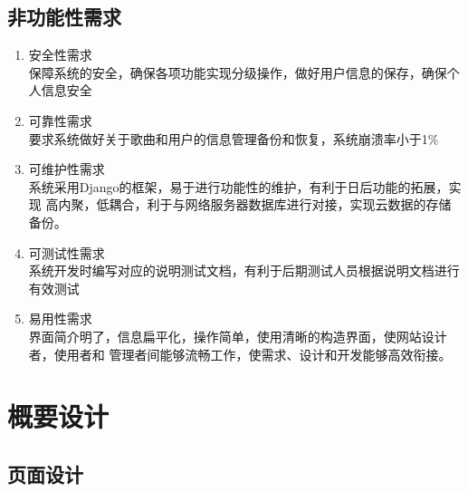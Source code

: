 \documentclass[UTF8,14pt]{article}
\numberwithin{figure}{subsubsection}
\numberwithin{table}{subsubsection}
\begin{document}
\subsection{非功能性需求}
\begin{enumerate}
	\setlength{\itemsep}{0pt}
	      \setlength{\parsep}{0pt}
	      \setlength{\parskip}{0pt}
	\item 安全性需求\\
	      保障系统的安全，确保各项功能实现分级操作，做好用户信息的保存，确保个人信息安全
	\item 可靠性需求\\
	      要求系统做好关于歌曲和用户的信息管理备份和恢复，系统崩溃率小于1\%
	\item 可维护性需求\\
	      系统采用Django的框架，易于进行功能性的维护，有利于日后功能的拓展，实现
	      高内聚，低耦合，利于与网络服务器数据库进行对接，实现云数据的存储备份。
	\item 可测试性需求\\
	      系统开发时编写对应的说明测试文档，有利于后期测试人员根据说明文档进行有效测试
	\item 易用性需求\\
	      界面简介明了，信息扁平化，操作简单，使用清晰的构造界面，使网站设计者，使用者和
	      管理者间能够流畅工作，使需求、设计和开发能够高效衔接。
\end{enumerate}
\clearpage
\section{概要设计}
\subsection{页面设计}
\vspace*{-0.3cm}
\end{document}
